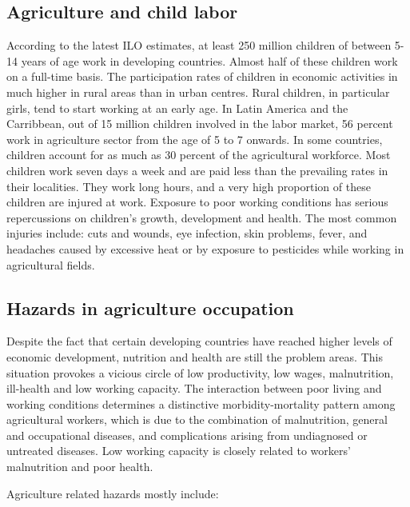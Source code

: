 \documentclass[
  openany]{book}
\begin{document}
\hypertarget{agriculture-and-child-labor}{%
\subsection{Agriculture and child labor}\label{agriculture-and-child-labor}}

According to the latest ILO estimates, at least 250 million children of between 5-14 years of age work in developing countries. Almost half of these children work on a full-time basis. The participation rates of children in economic activities in much higher in rural areas than in urban centres. Rural children, in particular girls, tend to start working at an early age. In Latin America and the Carribbean, out of 15 million children involved in the labor market, 56 percent work in agriculture sector from the age of 5 to 7 onwards. In some countries, children account for as much as 30 percent of the agricultural workforce. Most children work seven days a week and are paid less than the prevailing rates in their localities. They work long hours, and a very high proportion of these children are injured at work. Exposure to poor working conditions has serious repercussions on children's growth, development and health. The most common injuries include: cuts and wounds, eye infection, skin problems, fever, and headaches caused by excessive heat or by exposure to pesticides while working in agricultural fields.

\hypertarget{hazards-in-agriculture-occupation}{%
\subsection{Hazards in agriculture occupation}\label{hazards-in-agriculture-occupation}}

Despite the fact that certain developing countries have reached higher levels of economic development, nutrition and health are still the problem areas. This situation provokes a vicious circle of low productivity, low wages, malnutrition, ill-health and low working capacity. The interaction between poor living and working conditions determines a distinctive morbidity-mortality pattern among agricultural workers, which is due to the combination of malnutrition, general and occupational diseases, and complications arising from undiagnosed or untreated diseases. Low working capacity is closely related to workers' malnutrition and poor health.

Agriculture related hazards mostly include:
\end{document}
